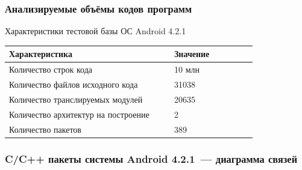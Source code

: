 \documentclass[hyperref={pdfpagelabels=false}]{beamer}
\begin{document}
\begin{frame}
\frametitle{Анализируемые объёмы кодов программ}
Характеристики тестовой базы ОС Android 4.2.1
\begin{table} [htbp]
  \centering
  \parbox{15cm}{\label{table:android-char}}
  \begin{tabular}{| p{0.6\linewidth} || p{0.3\linewidth} |}
  \hline
  \hline
  Характеристика   & Значение \\
  \hline
  \hline
  Количество строк кода   & 10 млн \\
  \hline
  Количество файлов исходного кода      & 31038    \\
  \hline
  Количество транслируемых модулей  & 20635   \\
  \hline
  Количество архитектур на построение & 2   \\
  \hline
  Количество пакетов & 389 \\
  \hline
  \hline
  \end{tabular}
\end{table}
\end{frame}
\begin{frame}
\frametitle{C/C++ пакеты системы Android 4.2.1~--- диаграмма связей}
\begin{figure}[h]
\end{figure}
\end{frame}
\end{document}
